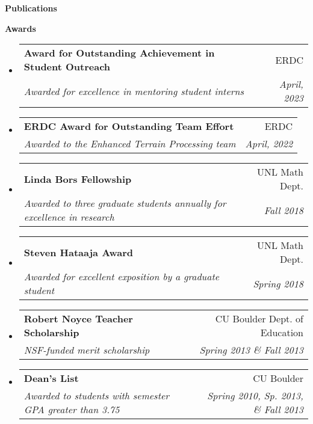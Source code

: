 \documentclass[letterpaper,11pt]{article}
\makeatletter
\newcommand{\resitem}[1]{\item #1 \vspace{-2pt}}
\newcommand{\resheading}[1]{{\large \colorbox{mygrey}{\begin{minipage}{\textwidth}{\textbf{#1 \vphantom{p\^{E}}}}\end{minipage}}}}
\newcommand{\ressubheading}[4]{
\begin{tabular*}{6.5in}{l@{\extracolsep{\fill}}r}
		\textbf{#1} & #2 \\
		\textit{#3} & \textit{#4} \\
\end{tabular*}\vspace{-6pt}}
\makeatother
\begin{document}
\begin{itemize}
{\begin{itemize}
				\end{itemize}
				}
	\end{itemize}

\resheading{Publications}

\nocite{*}
\printbibliography[heading=none]

\resheading{Awards}
\begin{itemize}
	\item 
	\ressubheading{Award for Outstanding Achievement in Student Outreach}{ERDC}{Awarded for excellence in mentoring student interns}{April, 2023}
	\item
	\ressubheading{ERDC Award for Outstanding Team Effort}{ERDC}{Awarded to the Enhanced Terrain Processing team}{April, 2022}
	\item
	\ressubheading{Linda Bors Fellowship}{UNL Math Dept.}{Awarded to three graduate students annually for excellence in research}{Fall 2018}
	\item
	\ressubheading{Steven Hataaja Award}{UNL Math Dept.}{Awarded for excellent exposition by a graduate student}{Spring 2018}
	\item
	\ressubheading{Robert Noyce Teacher Scholarship}{CU Boulder Dept. of Education}{NSF-funded merit scholarship}{Spring 2013 \& Fall 2013}
	\item
	\ressubheading{Dean's List}{CU Boulder}{Awarded to students with semester GPA greater than 3.75}{Spring 2010, Sp. 2013, \& Fall 2013}
\end{itemize}
\end{document}

